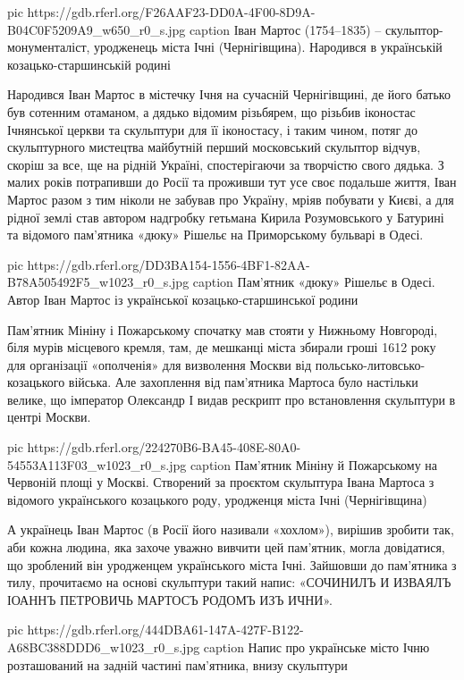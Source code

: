 \ifcmt
  pic https://gdb.rferl.org/F26AAF23-DD0A-4F00-8D9A-B04C0F5209A9_w650_r0_s.jpg
	caption Іван Мартос (1754–1835) – скульптор-монументаліст, уродженець міста Ічні (Чернігівщина). Народився в українській козацько-старшинській родині
\fi

Народився Іван Мартос в містечку Ічня на сучасній Чернігівщині, де його батько
був сотенним отаманом, а дядько відомим різьбярем, що різьбив іконостас
Ічнянської церкви та скульптури для її іконостасу, і таким чином, потяг до
скульптурного мистецтва майбутній перший московський скульптор відчув, скоріш
за все, ще на рідній Україні, спостерігаючи за творчістю свого дядька. З малих
років потрапивши до Росії та проживши тут усе своє подальше життя, Іван Мартос
разом з тим ніколи не забував про Україну, мріяв побувати у Києві, а для рідної
землі став автором надгробку гетьмана Кирила Розумовського у Батурині та
відомого пам'ятника «дюку» Рішельє на Приморському бульварі в Одесі.

\ifcmt
  pic https://gdb.rferl.org/DD3BA154-1556-4BF1-82AA-B78A505492F5_w1023_r0_s.jpg
	caption Пам'ятник «дюку» Рішельє в Одесі. Автор Іван Мартос із української козацько-старшинської родини
\fi

Пам'ятник Мініну і Пожарському спочатку мав стояти у Нижньому Новгороді, біля
мурів місцевого кремля, там, де мешканці міста збирали гроші 1612 року для
організації «ополченія» для визволення Москви від польсько-литовсько-козацького
війська. Але захоплення від пам'ятника Мартоса було настільки велике, що
імператор Олександр І видав рескрипт про встановлення скульптури в центрі
Москви.

\ifcmt
  pic https://gdb.rferl.org/224270B6-BA45-408E-80A0-54553A113F03_w1023_r0_s.jpg
	caption Пам'ятник Мініну й Пожарському на Червоній площі у Москві. Створений за проєктом скульптура Івана Мартоса з відомого українського козацького роду, уродженця міста Ічні (Чернігівщина)
\fi

А українець Іван Мартос (в Росії його називали «хохлом»), вирішив зробити так,
аби кожна людина, яка захоче уважно вивчити цей пам'ятник, могла довідатися, що
зроблений він уродженцем українського міста Ічні. Зайшовши до пам'ятника з
тилу, прочитаємо на основі скульптури такий напис: «СОЧИНИЛЪ И ИЗВАЯЛЪ ІОАННЪ
ПЕТРОВИЧЬ МАРТОСЪ РОДОМЪ ИЗЪ ИЧНИ».

\ifcmt
  pic https://gdb.rferl.org/444DBA61-147A-427F-B122-A68BC388DDD6_w1023_r0_s.jpg
	caption Напис про українське місто Ічню розташований на задній частині пам'ятника, внизу скульптури


